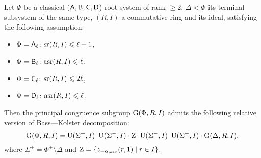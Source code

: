 \begin{thm}\label{thm:BassKolster}
Let $\Phi$ be a classical ($\mathsf{A},\mathsf{B},\mathsf{C},\mathsf{D}$) root system of rank $\geqslant2$, $\Delta<\Phi$ its terminal subsystem of the same type, $(R,I)$ a commutative ring and its ideal, satisfying the following assumption:
\begin{itemize}
\item $\Phi=\mathsf{A}_\ell$: $\operatorname{sr}(R,I)\leqslant\ell+1$,
\item $\Phi=\mathsf{B}_\ell$: $\operatorname{asr}(R,I)\leqslant\ell$,
\item $\Phi=\mathsf{C}_\ell$: $\operatorname{sr}(R,I)\leqslant2\ell$,
\item $\Phi=\mathsf{D}_\ell$: $\operatorname{asr}(R,I)\leqslant\ell$.
\end{itemize}
Then the principal congruence subgroup $\operatorname{G}(\Phi,R,I)$ admits the following relative version of Bass---Kolster decomposition:
\[ \operatorname{G}(\Phi,R,I)=\operatorname{U}(\Sigma^+,I)\ \operatorname{U}(\Sigma^-,I)\cdot \operatorname{Z}\cdot \operatorname{U}(\Sigma^-,I)\ \operatorname{U}(\Sigma^+,I)\cdot \operatorname{G}(\Delta,R,I), \]
where $\Sigma^\pm=\Phi^\pm\setminus\Delta$ and $\operatorname{Z}=\{ z_{-\alpha_\mathrm{max}}(r,1)\mid r\in I \}$.
\end{thm}
